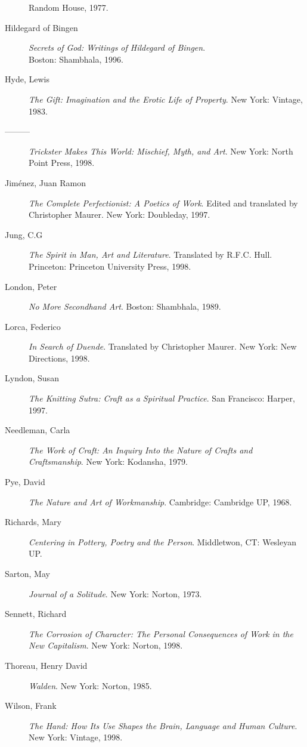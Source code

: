 \documentclass[letterpaper,10pt,headsepline]{scrreprt}
\begin{document}
\begin{description}
  Random House, 1977.
\item [Hildegard of Bingen] \textit{Secrets of God: Writings of
    Hildegard of Bingen}.\\ Boston: Shambhala, 1996.
\item [Hyde, Lewis] \textit{The Gift: Imagination and the Erotic Life
    of Property}. New York: Vintage, 1983.
\item [---------] \textit{Trickster Makes This World: Mischief, Myth,
    and Art}. New York: North Point Press, 1998.
\item [Jim\'enez, Juan Ramon] \textit{The Complete Perfectionist: A
    Poetics of Work}. Edited and translated by Christopher Maurer. New
  York: Doubleday, 1997.
\item [Jung, C.G] \textit{The Spirit in Man, Art and Literature}.
  Translated by R.F.C. Hull. Princeton: Princeton University Press,
  1998.
\item [London, Peter] \textit{No More Secondhand Art}. Boston:
  Shambhala, 1989.
\item [Lorca, Federico] \textit{In Search of Duende}. Translated by
  Christopher Maurer. New York: New Directions, 1998.
\item [Lyndon, Susan] \textit{The Knitting Sutra: Craft as a Spiritual
    Practice}. San Francisco: Harper, 1997.
\item [Needleman, Carla] \textit{The Work of Craft: An Inquiry Into
    the Nature of Crafts and Craftsmanship}. New York: Kodansha, 1979.
\item [Pye, David] \textit{The Nature and Art of Workmanship}.
  Cambridge: Cambridge UP, 1968.
\item [Richards, Mary] \textit{Centering in Pottery, Poetry and the
    Person}. Middletwon, CT: Wesleyan UP.
\item [Sarton, May] \textit{Journal of a Solitude}. New York: Norton,
  1973.
\item [Sennett, Richard] \textit{The Corrosion of Character: The
    Personal Consequences of Work in the New Capitalism}. New York:
  Norton, 1998.
\item [Thoreau, Henry David] \textit{Walden}. New York: Norton, 1985.
\item [Wilson, Frank] \textit{The Hand: How Its Use Shapes the Brain,
    Language and Human Culture}. New York: Vintage, 1998.
\end{description}
\newpage
\end{document}
